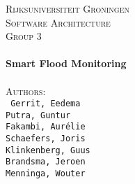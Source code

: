 
\begin{titlepage}

\center
\textsc{\LARGE Rijksuniversiteit Groningen}\\[1.5cm] %
\textsc{\Large Software Architecture}\\[0.5cm] %
\textsc{\large Group 3}\\[0.5cm] %


\HRule \\[0.4cm]
{ \huge \bfseries Smart Flood Monitoring}\\[0.4cm] %
\HRule \\[1.5cm]


\textsc{\Large Authors:}\\
\texttt{
Gerrit, Eedema\\
Putra, Guntur\\
Fakambi, Aurélie\\
Schaefers, Joris\\
Klinkenberg, Guus\\
Brandsma, Jeroen\\
Menninga, Wouter
}




\end{titlepage}